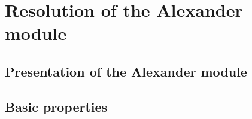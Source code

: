 \section{Resolution of the Alexander module}
\label{section2}

\subsection{{Presentation} of the Alexander module}
\label{alexander module discussion}



\subsection{Basic properties}



%
% 

